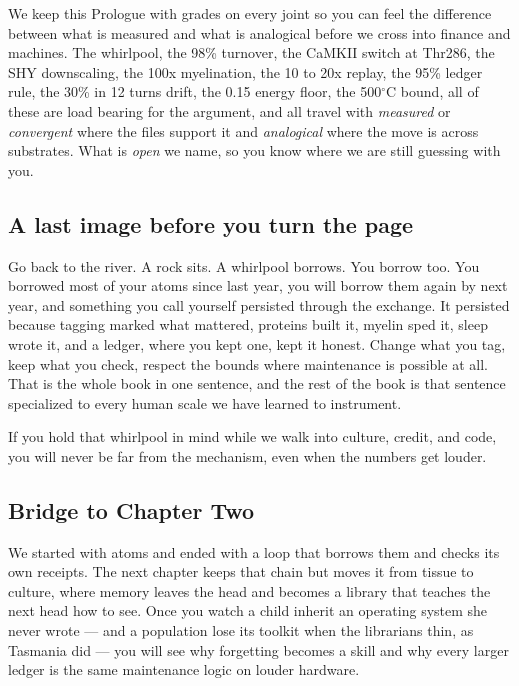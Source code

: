 We keep this Prologue with grades on every joint so you can feel the difference between what is measured and what is analogical before we cross into finance and machines. The whirlpool, the 98\% turnover, the CaMKII switch at Thr286, the SHY downscaling, the 100x myelination, the 10 to 20x replay, the 95\% ledger rule, the 30\% in 12 turns drift, the 0.15 energy floor, the 500$^\circ$C bound, all of these are load bearing for the argument, and all travel with \textit{measured} or \textit{convergent} where the files support it and \textit{analogical} where the move is across substrates. What is \textit{open} we name, so you know where we are still guessing with you.

\subsection*{A last image before you turn the page}

Go back to the river. A rock sits. A whirlpool borrows. You borrow too. You borrowed most of your atoms since last year, you will borrow them again by next year, and something you call yourself persisted through the exchange. It persisted because tagging marked what mattered, proteins built it, myelin sped it, sleep wrote it, and a ledger, where you kept one, kept it honest. Change what you tag, keep what you check, respect the bounds where maintenance is possible at all. That is the whole book in one sentence, and the rest of the book is that sentence specialized to every human scale we have learned to instrument.

If you hold that whirlpool in mind while we walk into culture, credit, and code, you will never be far from the mechanism, even when the numbers get louder.

\subsection*{Bridge to Chapter Two}

We started with atoms and ended with a loop that borrows them and checks its own receipts. The next chapter keeps that chain but moves it from tissue to culture, where memory leaves the head and becomes a library that teaches the next head how to see. Once you watch a child inherit an operating system she never wrote --- and a population lose its toolkit when the librarians thin, as Tasmania did --- you will see why forgetting becomes a skill and why every larger ledger is the same maintenance logic on louder hardware.
